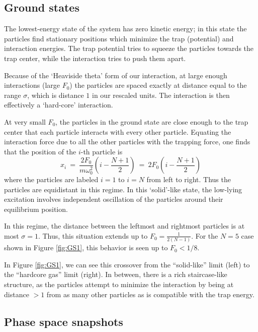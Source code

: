 \documentclass[onecolumn,pra]{revtex4-1}
\begin{document}
\subsection{Ground states}

The lowest-energy state of the system has zero kinetic energy; in this state the particles find
stationary positions which minimize the trap (potential) and interaction energies.  The trap
potential tries to squeeze the particles towards the trap center, while the interaction tries to push
them apart.

Because of the `Heaviside theta' form of our interaction, at large enough interactions (large $F_0$)
the particles are spaced exactly at distance equal to the range $\sigma$, which is distance $1$ in
our rescaled units.  The interaction is then effectively a `hard-core' interaction.

At very small $F_0$, the particles in the ground state are close enough to the trap center that each
particle interacts with every other particle.  Equating the interaction force due to all the other
particles with the trapping force, one finds that the position of the $i$-th particle is
\begin{equation}
x_i ~=~ \frac{2F_0}{m\omega_0^2} \left( i - \frac{N+1}{2} \right) ~=~ 2F_0 \left( i - \frac{N+1}{2} \right)
\end{equation}
where the particles are labeled $i=1$ to $i=N$ from left to right.  Thus the particles are
equidistant in this regime.  In this `solid'-like state, the low-lying
excitation involves independent oscillation of the particles around their equilibrium position.

In this regime, the distance between the leftmost and rightmost particles is at most $\sigma=1$.
Thus, this situation extends up to $F_0 = \frac{1}{2(N-1)}$.  For the $N=5$ case shown in Figure
\ref{fig:GS1}, this behavior is seen up to $F_0 < 1/8$.


In Figure \ref{fig:GS1}, we can see this crossover from the ``solid-like'' limit (left) to the
``hardcore gas'' limit (right).  In between, there is a rich staircase-like structure, as the
particles attempt to minimize the interaction by being at distance $>1$ from as many other particles
as is compatible with the trap energy.


\subsection{Phase space snapshots}
\end{document}
